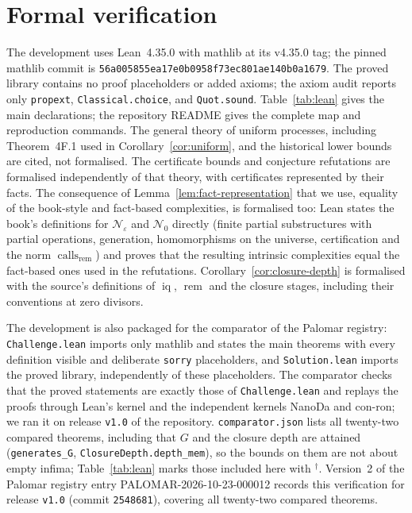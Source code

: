 \documentclass[11pt]{article}
\theoremstyle{remark}
\newcommand{\rem}{\operatorname{rem}}
\newcommand{\calls}{\operatorname{calls}}
\newcommand{\lean}[1]{\nolinkurl{#1}}
\begin{document}
\section{Formal verification}\label{app:lean}
The development uses Lean~4.35.0 \cite{deMouraUllrich2021} with mathlib
\cite{mathlib2020} at its v4.35.0 tag; the pinned mathlib commit is
\texttt{56a005855ea17e0b0958f73ec801ae140b0a1679}.
The proved library contains no proof placeholders or added axioms; the axiom audit
reports only \texttt{propext}, \texttt{Classical.choice}, and
\texttt{Quot.sound}. Table~\ref{tab:lean} gives the main declarations;
the repository README gives the
complete map and reproduction commands.
The general theory of uniform processes, including Theorem~4F.1 used in
Corollary~\ref{cor:uniform}, and the historical lower bounds are cited,
not formalised. The certificate bounds and conjecture refutations are
formalised independently of that theory, with certificates represented by
their facts. The consequence of Lemma~\ref{lem:fact-representation} that we
use, equality of the book-style and fact-based complexities, is formalised
too: Lean
states the book's definitions for $\mathcal N_\varepsilon$ and
$\mathcal N_0$ directly (finite partial substructures with partial
operations, generation, homomorphisms on the universe, certification and
the norm $\calls_{\rem}$) and proves that the resulting intrinsic
complexities equal the fact-based ones used in the refutations.
Corollary~\ref{cor:closure-depth} is formalised with
the source's definitions of $\operatorname{iq}$, $\rem$ and the closure
stages, including their conventions at zero divisors.

The development is also packaged for the comparator of the Palomar
registry: \texttt{Challenge.lean} imports only mathlib and states the main
theorems with every definition visible and deliberate \texttt{sorry}
placeholders, and \texttt{Solution.lean} imports the proved library,
independently of these placeholders. The comparator checks that the proved
statements are exactly those of \texttt{Challenge.lean} and replays the
proofs through Lean's kernel and the independent kernels NanoDa and con-ron;
we ran it on release \texttt{v1.0} of the repository.
\texttt{comparator.json} lists all twenty-two compared theorems, including
that $G$ and the closure depth are attained (\lean{generates_G},
\lean{ClosureDepth.depth_mem}), so the bounds on them are not about empty
infima; Table~\ref{tab:lean} marks those included here with ${}^\dagger$.
Version~2 of the Palomar registry entry PALOMAR-2026-10-23-000012
\cite{palomar2026} records this verification for release \texttt{v1.0}
(commit \texttt{2548681}), covering all twenty-two compared theorems.
\end{document}
